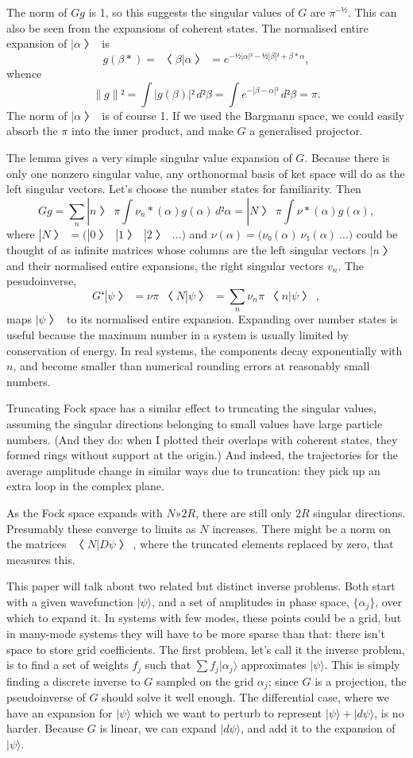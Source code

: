 The norm of $Gg$ is 1, so this suggests the singular values of $G$ are $π^{-½}$.  This can also be seen from the expansions of coherent states.  The normalised entire expansion of $|α〉$ is
$$g(β*)=〈β|α〉=e^{-½|α|²-½|β|²+β*α},$$
whence
$$\|g\|²=\int |g(β)|²\,d²β=\int e^{-|β-α|²}\,d²β=π.$$
The norm of $|α〉$ is of course 1.  If we used the Bargmann space, we could easily absorb the $π$ into the inner product, and make $G$ a generalised projector.

The lemma gives a very simple singular value expansion of $G$.  Because there is only one nonzero singular value, any orthonormal basis of ket space will do as the left singular vectors.  Let's choose the number states for familiarity.  Then
$$Gg=∑_n |n〉π\int ν_n*(α)g(α)\,d²α=|N〉π\int ν*(α)g(α),$$
where $|N〉=\bigl(|0〉\ |1〉\ |2〉\ …\bigr)$ and $ν(α)=\bigl(ν₀(α)\ ν₁(α)\ …\bigr)$ could be thought of as infinite matrices whose columns are the left singular vectors $|n〉$ and their normalised entire expansions, the right singular vectors $v_n$.  The pesudoinverse, 
$$G⁺|ψ〉=νπ〈N|ψ〉= ∑_n ν_nπ〈n|ψ〉,$$
maps $|ψ〉$ to its normalised entire expansion.  Expanding over number states is useful because the maximum number in a system is usually limited by conservation of energy.  In real systems, the components decay exponentially with $n$, and become smaller than numerical rounding errors at reasonably small numbers.

Truncating Fock space has a similar effect to truncating the singular values, assuming the singular directions belonging to small values have large particle numbers.  (And they do: when I plotted their overlaps with coherent states, they formed rings without support at the origin.)  And indeed, the trajectories for the average amplitude change in similar ways due to truncation: they pick up an extra loop in the complex plane.

As the Fock space expands with $N»2R$, there are still only $2R$ singular directions.  Presumably these converge to limits as $N$ increases.  There might be a norm on the matrices $〈N|Dψ〉$, where the truncated elements replaced by zero, that measures this.


This paper will talk about two related but distinct inverse problems.  Both start with a given wavefunction $|ψ\rangle$, and a set of amplitudes in phase space, $\{α_j\}$, over which to expand it.  In systems with few modes, these points could be a grid, but in many-mode systems they will have to be more sparse than that: there isn't space to store grid coefficients.  The first problem, let's call it the inverse problem, is to find a set of weights $f_j$ such that $∑f_j|α_j\rangle$ approximates $|ψ\rangle$.  This is simply finding a discrete inverse to $G$ sampled on the grid $α_j$; since $G$ is a projection, the pseudoinverse of $G$ should solve it well enough.  The differential case, where we have an expansion for $|ψ\rangle$ which we want to perturb to represent $|ψ\rangle+|dψ\rangle$, is no harder.  Because $G$ is linear, we can expand $|dψ\rangle$, and add it to the expansion of $|ψ\rangle$.

